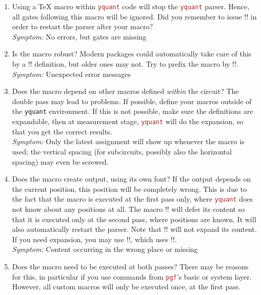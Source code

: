 \documentclass{scrartcl}
\def\pkg#1{\textcolor{brown}{\texttt{#1}}}
\def\Yquant{\pkg{yquant}}
\begin{document}
      \begin{enumerate}
         \item Using a \TeX{} macro within \Yquant{} code will stop the \Yquant{} parser.
            Hence, all gates following this macro will be ignored.
            Did you remember to issue \tex!\yquant! in order to restart the parser after your macro? \\
            \emph{Symptom:} No errors, but gates are missing
         \item Is the macro robust?
            Modern packages could automatically take care of this by a \tex!\protected! definition, but older ones may not.
            Try to prefix the macro by \tex!\protect!. \\
            \emph{Symptom:} Unexpected error messages
         \item Does the macro depend on other macros defined \emph{within} the circuit?
            The double pass may lead to problems.
            If possible, define your macros outside of the \texttt{yquant} environment.
            If this is not possible, make sure the definitions are expandable, then at measurement stage, \Yquant{} will do the expansion, so that you get the correct results. \\
            \emph{Symptom:} Only the latest assignment will show up whenever the macro is used; the vertical spacing (for subcircuits, possibly also the horizontal spacing) may even be screwed.
         \item Does the macro create output, using its own font?
            If the output depends on the current position, this position will be completely wrong.
            This is due to the fact that the macro is executed at the first pass only, where \Yquant{} does not know about any positions at all.
            The macro \tex!\yquantsecondpass! will defer its content so that it is executed only at the second pass, where positions are known.
            It will also automatically restart the parser.
            Note that \tex!\yquantsecondpass! will not expand its content.
            If you need expansion, you may use \tex!\yquantesecondpass!, which uses \tex!\protected@edef!. \\
            \emph{Symptom:} Content occurring in the wrong place or missing
         \item Does the macro need to be executed at both passes?
            There may be reasons for this, in particular if you use commands from \pkg{pgf}'s basic or system layer.
            However, all custom macros will only be executed once, at the first pass.

\end{enumerate}
\end{document}
